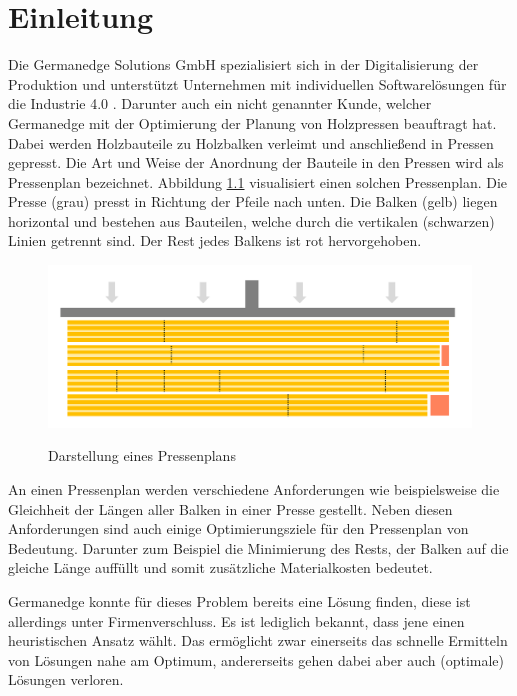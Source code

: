\chapter{Einleitung}
\label{chapter:Einleitung}

Die Germanedge Solutions GmbH spezialisiert sich in der Digitalisierung der Produktion und
unterstützt Unternehmen mit individuellen Softwarelösungen für die Industrie 4.0 \cite{industry4dot0}.
Darunter auch ein nicht genannter Kunde, welcher Germanedge mit der Optimierung der Planung von Holzpressen beauftragt hat.
Dabei werden Holzbauteile zu Holzbalken verleimt und anschließend in Pressen gepresst.
Die Art und Weise der Anordnung der Bauteile in den Pressen wird als Pressenplan bezeichnet.
Abbildung \ref{figure:pressenplan} visualisiert einen solchen Pressenplan.
Die Presse (grau) presst in Richtung der Pfeile nach unten.
Die Balken (gelb) liegen horizontal und bestehen aus Bauteilen, welche durch die vertikalen (schwarzen) Linien getrennt sind.
Der Rest jedes Balkens ist rot hervorgehoben.

\begin{figure}[h]
    \centering
    \includegraphics[width=1.00\textwidth, center]{Images/Pressenplan}\\
    \caption{Darstellung eines Pressenplans}
    \label{figure:pressenplan}
\end{figure}

An einen Pressenplan werden verschiedene Anforderungen wie beispielsweise die Gleichheit der Längen aller Balken in einer Presse gestellt.
Neben diesen Anforderungen sind auch einige Optimierungsziele für den Pressenplan von Bedeutung.
Darunter zum Beispiel die Minimierung des Rests, der Balken auf die gleiche Länge auffüllt und somit zusätzliche Materialkosten bedeutet.

Germanedge konnte für dieses Problem bereits eine Lösung finden, diese ist allerdings unter Firmenverschluss.
Es ist lediglich bekannt, dass jene einen heuristischen Ansatz wählt.
Das ermöglicht zwar einerseits das schnelle Ermitteln von Lösungen nahe am Optimum, andererseits gehen dabei aber auch (optimale) Lösungen verloren.

